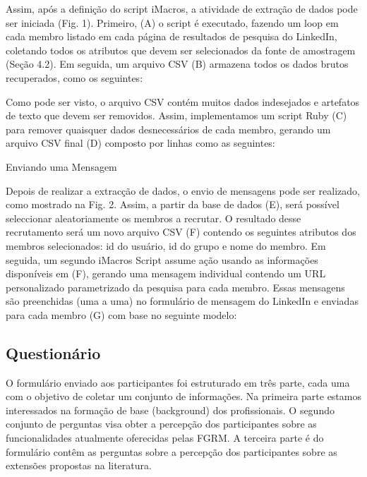 Assim, após a definição do script iMacros, a atividade de extração de dados pode
ser iniciada (Fig. 1). Primeiro, (A) o script é executado, fazendo um loop em
cada membro listado em cada página de resultados de pesquisa do LinkedIn,
coletando todos os atributos que devem ser selecionados da fonte de amostragem
(Seção 4.2). Em seguida, um arquivo CSV (B) armazena todos os dados brutos
recuperados, como os seguintes:


Como pode ser visto, o arquivo CSV contém muitos dados indesejados e artefatos
de texto que devem ser removidos. Assim, implementamos um script Ruby (C) para
remover quaisquer dados desnecessários de cada membro, gerando um arquivo CSV
final (D) composto por linhas como as seguintes:

Enviando uma Mensagem

Depois de realizar a extracção de dados, o envio de mensagens pode ser
realizado, como mostrado na Fig. 2. Assim, a partir da base de dados (E), será
possível seleccionar aleatoriamente os membros a recrutar. O resultado desse
recrutamento será um novo arquivo CSV (F) contendo os seguintes atributos dos
membros selecionados: id do usuário, id do grupo e nome do membro. Em seguida,
um segundo iMacros Script assume ação usando as informações disponíveis em (F),
gerando uma mensagem individual contendo um URL personalizado parametrizado da
pesquisa para cada membro. Essas mensagens são preenchidas (uma a uma) no
formulário de mensagem do LinkedIn e enviadas para cada membro (G) com base no
seguinte modelo:



\subsection{Questionário}
\label{subsec:questionario}

O formulário enviado aos participantes foi estruturado em três parte, cada uma
com o objetivo de coletar um conjunto de informações. Na primeira parte estamos
interessados na formação de base (background) dos profissionais. O segundo
conjunto de perguntas visa obter a percepção dos participantes sobre as
funcionalidades atualmente oferecidas pelas FGRM\@. A terceira parte é do
formulário contêm as perguntas sobre a percepção dos participantes sobre as
extensões propostas na literatura. 

